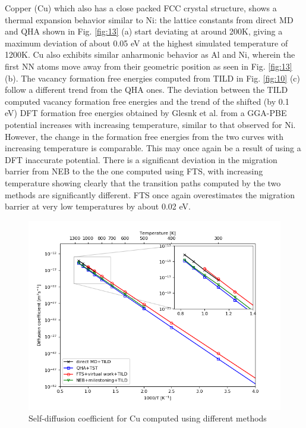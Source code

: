 \documentclass{article}
\begin{document}
Copper (Cu) which also has a close packed FCC crystal structure, shows a thermal expansion behavior similar to Ni: the lattice constants from direct MD and QHA shown in Fig. \ref{fig:13} (a) start deviating at around 200K, giving a maximum deviation of about 0.05 eV at the highest simulated temperature of 1200K. Cu also exhibits similar anharmonic behavior as Al and Ni, wherein the first NN atoms move away from their geometric position as seen in Fig. \ref{fig:13} (b). The vacancy formation free energies computed from TILD in Fig. \ref{fig:10} (c) follow a different trend from the QHA ones. The deviation between the TILD computed vacancy formation free energies and the trend of the shifted (by 0.1 eV) DFT formation free energies obtained by Glesnk et al. \cite{Glensk2013} from a GGA-PBE potential increases with increasing temperature, similar to that observed for Ni. However, the change in the formation free energies from the two curves with increasing temperature is comparable. This may once again be a result of using a DFT inaccurate potential. There is a significant deviation in the migration barrier from NEB to the the one computed using FTS, with increasing temperature showing clearly that the transition paths computed by the two methods are significantly different. FTS once again overestimates the migration barrier at very low temperatures by about 0.02 eV. 

\begin{figure}[htp]
\centering
\includegraphics[scale=0.65]{cu_self_diffusion}
\caption{Self-diffusion coefficient for Cu computed using different methods}
\label{fig:14}
\end{figure}
\end{document}

